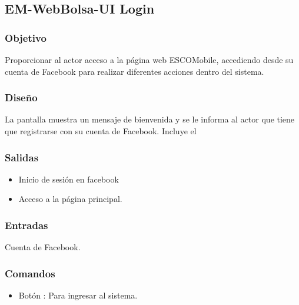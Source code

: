 



\subsection{EM-WebBolsa-UI Login  }

\subsubsection{Objetivo}
	\noindent
	Proporcionar al actor acceso a la página web ESCOMobile, accediendo desde su cuenta de Facebook para realizar diferentes acciones dentro del sistema.

\subsubsection{Diseño}
		\noindent
		La pantalla  muestra un mensaje de bienvenida y se le informa al actor que tiene que registrarse con su cuenta de Facebook.
		Incluye el 
	

\subsubsection{Salidas}
\begin{itemize}
			\item Inicio de sesión en facebook
			\item Acceso a la página principal.
			\end{itemize}

\subsubsection{Entradas}
	\noindent
	Cuenta de Facebook.

\subsubsection{Comandos}
\begin{itemize}
		\item Botón : Para ingresar al sistema.
	\end{itemize}


